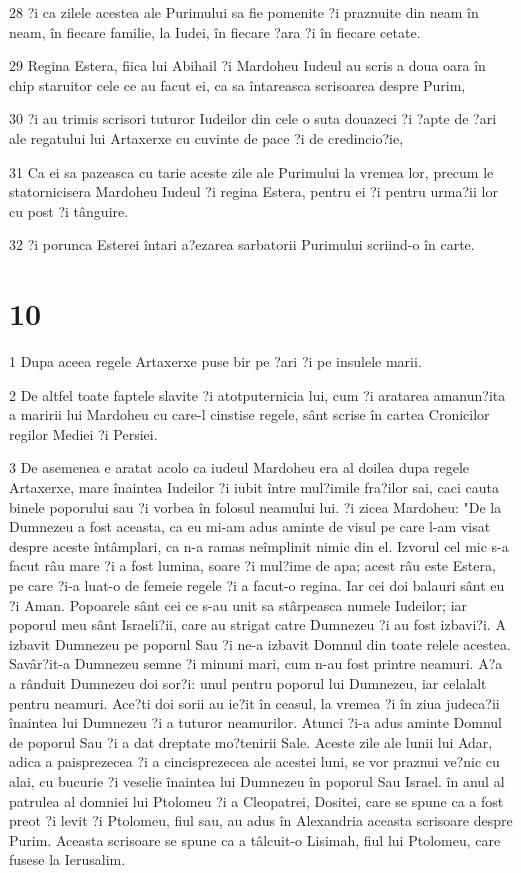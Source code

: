 \par 28 ?i ca zilele acestea ale Purimului sa fie pomenite ?i praznuite din neam în neam, în fiecare familie, la Iudei, în fiecare ?ara ?i în fiecare cetate.
\par 29 Regina Estera, fiica lui Abihail ?i Mardoheu Iudeul au scris a doua oara în chip staruitor cele ce au facut ei, ca sa întareasca scrisoarea despre Purim,
\par 30 ?i au trimis scrisori tuturor Iudeilor din cele o suta douazeci ?i ?apte de ?ari ale regatului lui Artaxerxe cu cuvinte de pace ?i de credincio?ie,
\par 31 Ca ei sa pazeasca cu tarie aceste zile ale Purimului la vremea lor, precum le statornicisera Mardoheu Iudeul ?i regina Estera, pentru ei ?i pentru urma?ii lor cu post ?i tânguire.
\par 32 ?i porunca Esterei întari a?ezarea sarbatorii Purimului scriind-o în carte.

\chapter{10}

\par 1 Dupa aceea regele Artaxerxe puse bir pe ?ari ?i pe insulele marii.
\par 2 De altfel toate faptele slavite ?i atotputernicia lui, cum ?i aratarea amanun?ita a maririi lui Mardoheu cu care-l cinstise regele, sânt scrise în cartea Cronicilor regilor Mediei ?i Persiei.
\par 3 De asemenea e aratat acolo ca iudeul Mardoheu era al doilea dupa regele Artaxerxe, mare înaintea Iudeilor ?i iubit între mul?imile fra?ilor sai, caci cauta binele poporului sau ?i vorbea în folosul neamului lui. ?i zicea Mardoheu: "De la Dumnezeu a fost aceasta, ca eu mi-am adus aminte de visul pe care l-am visat despre aceste întâmplari, ca n-a ramas neîmplinit nimic din el. Izvorul cel mic s-a facut râu mare ?i a fost lumina, soare ?i mul?ime de apa; acest râu este Estera, pe care ?i-a luat-o de femeie regele ?i a facut-o regina. Iar cei doi balauri sânt eu ?i Aman. Popoarele sânt cei ce s-au unit sa stârpeasca numele Iudeilor; iar poporul meu sânt Israeli?ii, care au strigat catre Dumnezeu ?i au fost izbavi?i. A izbavit Dumnezeu pe poporul Sau ?i ne-a izbavit Domnul din toate relele acestea. Savâr?it-a Dumnezeu semne ?i minuni mari, cum n-au fost printre neamuri. A?a a rânduit Dumnezeu doi sor?i: unul pentru poporul lui Dumnezeu, iar celalalt pentru neamuri. Ace?ti doi sorii au ie?it în ceasul, la vremea ?i în ziua judeca?ii înaintea lui Dumnezeu ?i a tuturor neamurilor. Atunci ?i-a adus aminte Domnul de poporul Sau ?i a dat dreptate mo?tenirii Sale. Aceste zile ale lunii lui Adar, adica a paisprezecea ?i a cincisprezecea ale acestei luni, se vor praznui ve?nic cu alai, cu bucurie ?i veselie înaintea lui Dumnezeu în poporul Sau Israel. în anul al patrulea al domniei lui Ptolomeu ?i a Cleopatrei, Dositei, care se spune ca a fost preot ?i levit ?i Ptolomeu, fiul sau, au adus în Alexandria aceasta scrisoare despre Purim. Aceasta scrisoare se spune ca a tâlcuit-o Lisimah, fiul lui Ptolomeu, care fusese la Ierusalim.



